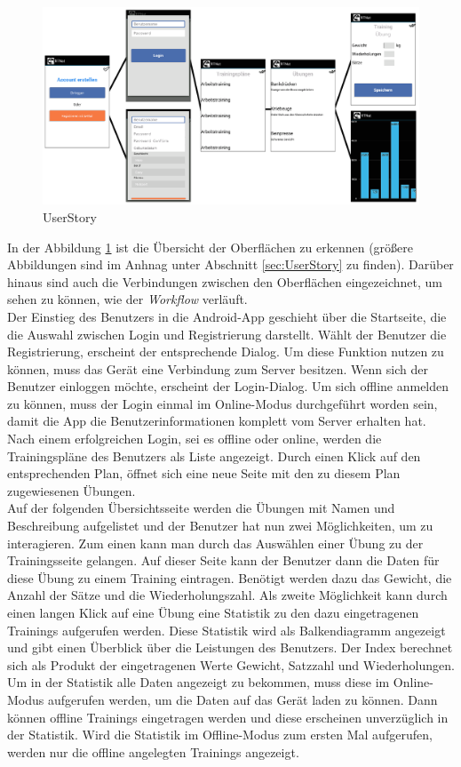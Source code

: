 \begin{figure}[!htbp]
\centering
\includegraphics[width=\textwidth, angle={90}]{content/images/UserStory}
\caption{UserStory}
\label{pic:UserStory}
\end{figure}

In der Abbildung \ref{pic:UserStory} ist die Übersicht der Oberflächen zu erkennen (größere Abbildungen sind im Anhnag unter Abschnitt \ref{sec:UserStory} zu finden). Darüber hinaus sind auch die Verbindungen zwischen den Oberflächen eingezeichnet, um sehen zu können, wie der \textit{Workflow} verläuft.\\
Der Einstieg des Benutzers in die Android-App geschieht über die Startseite, die die Auswahl zwischen Login und Registrierung darstellt. Wählt der Benutzer die Registrierung, erscheint der entsprechende Dialog. Um diese Funktion nutzen zu können, muss das Gerät eine Verbindung zum Server besitzen. 
Wenn sich der Benutzer einloggen möchte, erscheint der Login-Dialog. Um sich offline anmelden zu können, muss der Login einmal im Online-Modus durchgeführt worden sein, damit die App die Benutzerinformationen komplett vom Server erhalten hat.\\
Nach einem erfolgreichen Login, sei es offline oder online, werden die Trainingspläne des Benutzers als Liste angezeigt. Durch einen Klick auf den entsprechenden Plan, öffnet sich eine neue Seite mit den zu diesem Plan zugewiesenen Übungen.\\
Auf der folgenden Übersichtsseite werden die Übungen mit Namen und Beschreibung aufgelistet und der Benutzer hat nun zwei Möglichkeiten, um zu interagieren. Zum einen kann man durch das Auswählen einer Übung zu der Trainingsseite gelangen. Auf dieser Seite kann der Benutzer dann die Daten für diese Übung zu einem Training eintragen. Benötigt werden dazu das Gewicht, die Anzahl der Sätze und die Wiederholungszahl.
Als zweite Möglichkeit kann durch einen langen Klick auf eine Übung eine Statistik zu den dazu eingetragenen Trainings aufgerufen werden. Diese Statistik wird als Balkendiagramm angezeigt und gibt einen Überblick über die Leistungen des Benutzers. Der Index berechnet sich als Produkt der eingetragenen Werte Gewicht, Satzzahl und Wiederholungen.\\
Um in der Statistik alle Daten angezeigt zu bekommen, muss diese im Online-Modus aufgerufen werden, um die Daten auf das Gerät laden zu können. Dann können offline Trainings eingetragen werden und diese erscheinen unverzüglich in der Statistik. Wird die Statistik im Offline-Modus zum ersten Mal aufgerufen, werden nur die offline angelegten Trainings angezeigt.